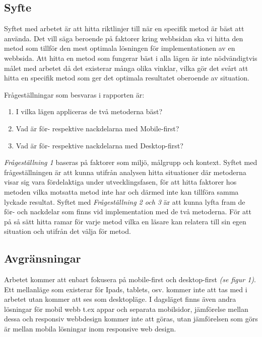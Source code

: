 \documentclass[11pt]{article}
\begin{document}
\subsection{Syfte}
Syftet med arbetet är att hitta riktlinjer till när en specifik metod är bäst att använda. Det vill säga beroende på faktorer kring webbsidan ska vi hitta den metod som tillför den mest optimala lösningen för implementationen av en webbsida. Att hitta en metod som fungerar bäst i alla lägen är inte nödvändigtvis målet med arbetet då det existerar många olika vinklar, vilka gör det svårt att hitta en specifik metod som ger det optimala resultatet oberoende av situation.

\vspace{0.5cm}
Frågeställningar som besvaras i rapporten är:
\begin{enumerate}
	\item I vilka lägen appliceras de två metoderna bäst?
	\item Vad är för- respektive nackdelarna med Mobile-first?
	\item Vad är för- respektive nackdelarna med Desktop-first?
\end{enumerate}
\vspace{0.5cm}
\textit{Frågeställning 1} baseras på faktorer som miljö, målgrupp och kontext. Syftet med frågeställningen är att kunna utifrån analysen hitta situationer där metoderna visar sig vara fördelaktiga under utvecklingsfasen, för att hitta faktorer hos metoden vilka motsatta metod inte har och därmed inte kan tillföra samma lyckade resultat. Syftet med \textit{Frågeställning 2 och 3} är att kunna lyfta fram de för- och nackdelar som finns vid implementation med de två metoderna. För att på så sätt hitta ramar för varje metod vilka en läsare kan relatera till sin egen situation och utifrån det välja för metod. 

\subsection{Avgränsningar}

Arbetet kommer att enbart fokusera på mobile-first och desktop-first \textit{(se figur 1)}. Ett mellanläge som existerar för Ipads, tablets, osv. kommer inte att tas med i arbetet utan kommer att ses som desktopläge. I dagsläget finns även andra lösningar för mobil webb t.ex appar och separata mobilsidor, jämförelse mellan dessa och responsiv webbdesign kommer inte att göras, utan jämförelsen som görs är mellan mobila lösningar inom responsive web design.
\end{document}
